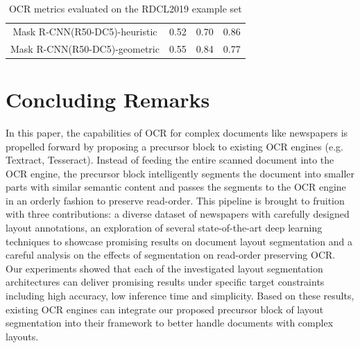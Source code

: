\documentclass[letterpaper]{article} %
\begin{document}
\begin{table}[h]
\begin{tabular}{c|ccc}

Mask R-CNN(R50-DC5)-heuristic & 0.52 & 0.70 & 0.86 \\

Mask R-CNN(R50-DC5)-geometric & 0.55 & 0.84 & 0.77 \\

\bottomrule
\end{tabular}
\caption{OCR metrics evaluated on the RDCL2019 example set }
\label{table:ocrmetric}
\end{table}

\section{Concluding Remarks}
In this paper, the capabilities of OCR for complex documents like newspapers is propelled forward by proposing a precursor block to existing OCR engines (e.g. Textract, Tesseract). Instead of feeding the entire scanned document into the OCR engine, the precursor block intelligently segments the document into smaller parts with similar semantic content and passes the segments to the OCR engine in an orderly fashion to preserve read-order.
This pipeline is brought to fruition with three contributions: a diverse dataset of newspapers with carefully designed layout annotations, an exploration of several state-of-the-art deep learning techniques to showcase promising results on document layout segmentation and a careful analysis on the effects of segmentation on read-order preserving OCR.
Our experiments showed that each of the investigated layout segmentation architectures can deliver promising results under specific target constraints including high accuracy, low inference time and simplicity. 
Based on these results, existing OCR engines can integrate our proposed precursor block of layout segmentation into their framework to better handle documents with complex layouts.
\end{document}
